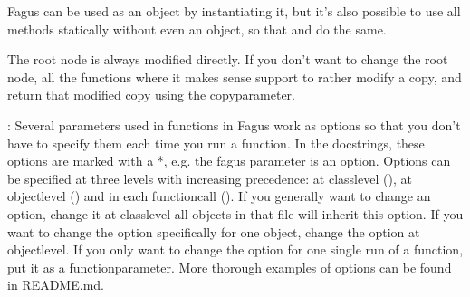 \documentclass[a4paper,10pt,english]{sphinxmanual}
\begin{document}
\begin{fulllineitems}
\sphinxAtStartPar
Fagus can be used as an object by instantiating it, but it’s also possible to use all methods statically without
even an object, so that  and  do the
same.

\sphinxAtStartPar
The root node is always modified directly. If you don’t want to change the root node, all the functions where it
makes sense support to rather modify a copy, and return that modified copy using the copy\sphinxhyphen{}parameter.

\sphinxAtStartPar
{}:
Several parameters used in functions in Fagus work as options so that you don’t have to specify them each time you
run a function. In the docstrings, these options are marked with a *, e.g. the fagus parameter is an option.
Options can be specified at three levels with increasing precedence: at class\sphinxhyphen{}level (), at
object\sphinxhyphen{}level () and in each function\sphinxhyphen{}call (). If you
generally want to change an option, change it at class\sphinxhyphen{}level \sphinxhyphen{} all objects in that file will inherit this option.
If you want to change the option specifically for one object, change the option at object\sphinxhyphen{}level. If you only want
to change the option for one single run of a function, put it as a function\sphinxhyphen{}parameter. More thorough examples of
options can be found in README.md.


\end{fulllineitems}
\end{document}
